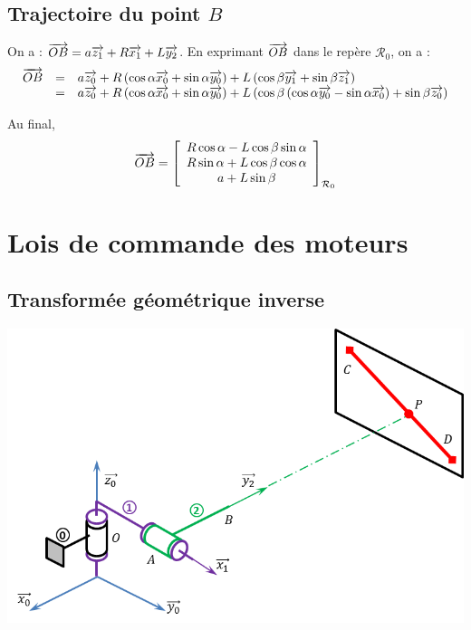 \documentclass[10pt,fleqn]{article} %
\begin{document}
\subsection{Trajectoire du point $B$}
On a : $\overrightarrow{OB} = a \overrightarrow{z_{1}} + R \overrightarrow{x_{1}} + L \overrightarrow{y_{2}}$. En exprimant $\overrightarrow{OB}$ dans le repère $\mathcal{R}_0$, on a : 
$$
\begin{array}{ccl}
\overrightarrow{OB} &=& a \overrightarrow{z_{0}} + R \left( \cos\alpha \overrightarrow{x_{0}} + \sin \alpha \overrightarrow{y_{0}} \right) + L \left( \cos \beta \overrightarrow{y_{1}} + \sin \beta \overrightarrow{z_{1}} \right) \\
 & = & a \overrightarrow{z_{0}} + R \left( \cos\alpha \overrightarrow{x_{0}} + \sin \alpha \overrightarrow{y_{0}} \right) + L \left( \cos \beta\left( \cos\alpha \overrightarrow{y_{0}} - \sin \alpha \overrightarrow{x_{0}} \right) + \sin \beta \overrightarrow{z_{0}} \right)\\
\end{array}
$$

Au final, 
$$
\overrightarrow{OB} = \left[
\begin{array}{c}
R  \cos\alpha - L\cos \beta\sin \alpha\\ 
R  \sin \alpha +L\cos \beta\cos\alpha\\
a + L\sin \beta 
\end{array}
\right]_{\mathcal{R}_0}
$$


\section{Lois de commande des moteurs}
\subsection{Transformée géométrique inverse}
\begin{center}
\includegraphics[width=\linewidth]{images/visee}
\end{center}
\end{document}

